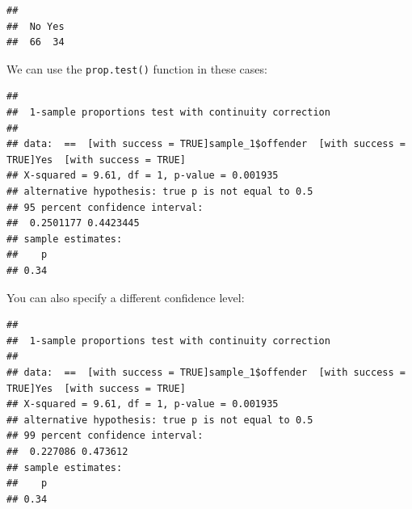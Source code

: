 \documentclass[
]{book}
\newenvironment{Shaded}{\begin{snugshade}}{\end{snugshade}}
\newcommand{\AttributeTok}[1]{\textcolor[rgb]{0.77,0.63,0.00}{#1}}
\newcommand{\CommentTok}[1]{\textcolor[rgb]{0.56,0.35,0.01}{\textit{#1}}}
\newcommand{\DecValTok}[1]{\textcolor[rgb]{0.00,0.00,0.81}{#1}}
\newcommand{\FunctionTok}[1]{\textcolor[rgb]{0.00,0.00,0.00}{#1}}
\newcommand{\NormalTok}[1]{#1}
\newcommand{\SpecialCharTok}[1]{\textcolor[rgb]{0.00,0.00,0.00}{#1}}
\newcommand{\StringTok}[1]{\textcolor[rgb]{0.31,0.60,0.02}{#1}}
\begin{document}
\begin{Shaded}
\end{Shaded}

\begin{verbatim}
## 
##  No Yes 
##  66  34
\end{verbatim}

We can use the \texttt{prop.test()} function in these cases:

\begin{Shaded}
\end{Shaded}

\begin{verbatim}
## 
##  1-sample proportions test with continuity correction
## 
## data:  ==  [with success = TRUE]sample_1$offender  [with success = TRUE]Yes  [with success = TRUE]
## X-squared = 9.61, df = 1, p-value = 0.001935
## alternative hypothesis: true p is not equal to 0.5
## 95 percent confidence interval:
##  0.2501177 0.4423445
## sample estimates:
##    p 
## 0.34
\end{verbatim}

You can also specify a different confidence level:

\begin{Shaded}
\end{Shaded}

\begin{verbatim}
## 
##  1-sample proportions test with continuity correction
## 
## data:  ==  [with success = TRUE]sample_1$offender  [with success = TRUE]Yes  [with success = TRUE]
## X-squared = 9.61, df = 1, p-value = 0.001935
## alternative hypothesis: true p is not equal to 0.5
## 99 percent confidence interval:
##  0.227086 0.473612
## sample estimates:
##    p 
## 0.34
\end{verbatim}
\end{document}
